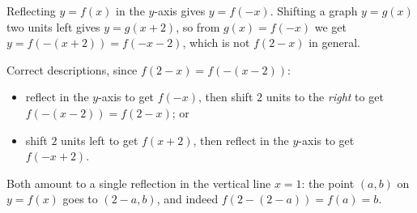 Reflecting $y=f(x)$ in the $y$-axis gives $y=f(-x)$. Shifting a graph $y=g(x)$ two units left gives $y=g(x+2)$, so from $g(x)=f(-x)$ we get $y=f(-(x+2))=f(-x-2)$, which is not $f(2-x)$ in general.

Correct descriptions, since $f(2-x)=f(-(x-2))$:
\begin{itemize}
\item reflect in the $y$-axis to get $f(-x)$, then shift $2$ units to the \emph{right} to get $f(-(x-2))=f(2-x)$; or
\item shift $2$ units left to get $f(x+2)$, then reflect in the $y$-axis to get $f(-x+2)$.
\end{itemize}
Both amount to a single reflection in the vertical line $x=1$: the point $(a,b)$ on $y=f(x)$ goes to $(2-a,b)$, and indeed $f(2-(2-a))=f(a)=b$.
